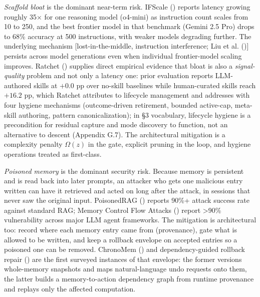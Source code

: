 \documentclass[
]{article}
\begin{document}
\emph{Scaffold bloat} is the dominant near-term risk. IFScale
()
reports latency growing roughly 35× for one reasoning model (o4-mini) as
instruction count scales from 10 to 250, and the best frontier model in
that benchmark (Gemini 2.5 Pro) drops to 68\% accuracy at 500
instructions, with weaker models degrading further. The underlying
mechanism {[}lost-in-the-middle, instruction interference; {Liu et al.}
(){]} persists across model
generations even when individual frontier-model scaling improves.
Ratchet () supplies
direct empirical evidence that bloat is also a \emph{signal-quality}
problem and not only a latency one: prior evaluation reports
LLM-authored skills at \(+0.0\) pp over no-skill baselines while
human-curated skills reach \(+16.2\) pp, which Ratchet attributes to
lifecycle management and addresses with four hygiene mechanisms
(outcome-driven retirement, bounded active-cap, meta-skill authoring,
pattern canonicalization); in §3 vocabulary, lifecycle hygiene is a
precondition for residual capture and mode discovery to function, not an
alternative to descent (Appendix G.7). The architectural mitigation is a
complexity penalty \(\Omega(z)\) in the gate, explicit pruning in the
loop, and hygiene operations treated as first-class.

\emph{Poisoned memory} is the dominant security risk. Because memory is
persistent and is read back into later prompts, an attacker who gets one
malicious entry written can have it retrieved and acted on long after
the attack, in sessions that never saw the original input. PoisonedRAG
() reports 90\%+
attack success rate against standard RAG; Memory Control Flow Attacks
() report \textgreater90\%
vulnerability across major LLM agent frameworks. The mitigation is
architectural too: record where each memory entry came from
(provenance), gate what is allowed to be written, and keep a rollback
envelope on accepted entries so a poisoned one can be removed. ChronoMem
() and dependency-guided
rollback repair ()
are the first surveyed instances of that envelope: the former versions
whole-memory snapshots and maps natural-language undo requests onto
them, the latter builds a memory-to-action dependency graph from runtime
provenance and replays only the affected computation.
\end{document}
